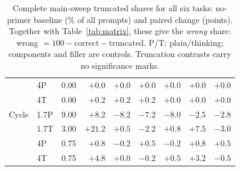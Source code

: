 \begin{table}[t]
\begin{tabular}{llrrrrrrr}
 & 4P & 0.00 & $+0.0$ & $+0.0$ & $+0.0$ & $+0.0$ & $+0.0$ & $+0.0$\\ %
 & 4T & 0.00 & $+0.2$ & $+0.2$ & $+0.2$ & $+0.0$ & $+0.0$ & $+0.0$\\ %
\addlinespace[2pt]
Cycle & 1.7P & 9.00 & $+8.2$ & $-8.2$ & $-7.2$ & $-8.0$ & $-2.5$ & $-2.8$\\ %
 & 1.7T & 3.00 & $+21.2$ & $+0.5$ & $-2.2$ & $+0.8$ & $+7.5$ & $-3.0$\\ %
 & 4P & 0.75 & $+0.8$ & $-0.2$ & $+0.5$ & $-0.2$ & $+0.8$ & $+0.5$\\ %
 & 4T & 0.75 & $+4.8$ & $+0.0$ & $-0.2$ & $+0.5$ & $+3.2$ & $-0.5$\\ %
\bottomrule
\end{tabular}
\caption{Complete main-sweep truncated shares for all six tasks: no-primer baseline (\% of all prompts) and paired change (points). Together with Table~\ref{tab:matrix}, these give the \emph{wrong} share: wrong $=100-{}$correct${}-{}$truncated. P/T: plain/thinking; components and filler are controls. Truncation contrasts carry no significance marks.} %
\label{tab:truncmatrix}
\end{table}
